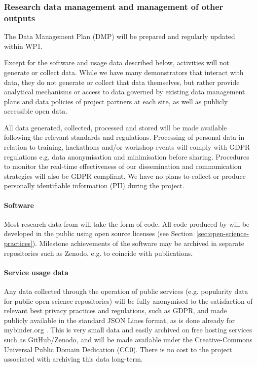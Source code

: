 
\subsubsection{Research data management and management of other outputs}

The Data Management Plan (DMP) will be prepared and regularly updated within WP1.

Except for the software and usage data described below,
\TheProject activities will not generate or collect data.
While we have many demonstrators that interact with data, they do not generate or collect that
data themselves, but rather provide analytical mechanisms or access to data governed by
existing data management plans and data policies of project partners at each site,
as well as publicly accessible open data.

All data generated, collected, processed and stored will be made available following the
relevant standards and regulations. Processing of personal data in relation to training,
hackathons and/or workshop events will comply with GDPR regulations e.g. data
anonymisation and minimisation before sharing.
Procedures to monitor the real-time effectiveness of our dissemination and
communication strategies will also be GDPR compliant.
We have no plans to collect or produce personally identifiable information (PII)
during the project.\medskip

\paragraph*{Software} 
Most research data from \TheProject will take the form of code.
All code produced by \TheProject will be developed in the public using open
source licenses (see Section~\ref{sec:open-science-practices}).
Milestone achievements of the software may be archived
in separate repositories such as Zenodo,
e.g. to coincide with publications.

\paragraph*{Service usage data} 
Any data collected through the operation of public services
(e.g. popularity data for public open science repositories)
will be fully anonymised to the satisfaction of relevant best privacy practices and regulations, such as GDPR,
and made publicly available in the standard JSON Lines format,
as is done already for mybinder.org \cite{mybinder-archive}.
This is very small data and easily archived on free hosting services such as GitHub/Zenodo,
and will be made available under the Creative-Commons Universal Public Domain Dedication (CC0).
There is no cost to the project associated with archiving this data long-term.


